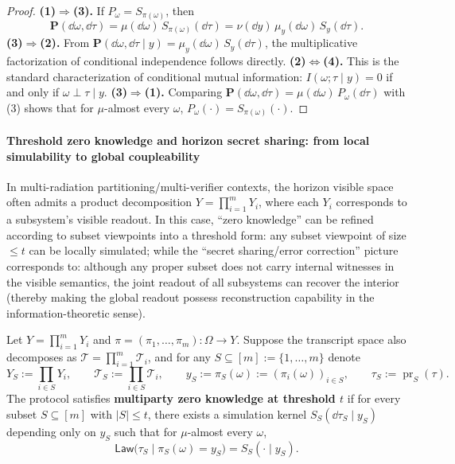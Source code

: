 \begin{proof}
\textbf{(1)\(\Rightarrow\)(3).}
If \(P_{\omega}=S_{\pi(\omega)}\), then
\[
\mathbf{P}(\dd\omega,\dd\tau)
=
\mu(\dd\omega)\,S_{\pi(\omega)}(\dd\tau)
=
\nu(\dd y)\,\mu_y(\dd\omega)\,S_y(\dd\tau).
\]
\textbf{(3)\(\Rightarrow\)(2).}
From \(\mathbf{P}(\dd\omega,\dd\tau\mid y)=\mu_y(\dd\omega)\,S_y(\dd\tau)\), the multiplicative factorization of conditional independence follows directly.
\textbf{(2)\(\Leftrightarrow\)(4).}
This is the standard characterization of conditional mutual information: \(I(\omega;\tau\mid y)=0\) if and only if \(\omega\perp \tau\mid y\).
\textbf{(3)\(\Rightarrow\)(1).}
Comparing \(\mathbf{P}(\dd\omega,\dd\tau)=\mu(\dd\omega)\,P_{\omega}(\dd\tau)\) with (3) shows that for \(\mu\)-almost every \(\omega\), \(P_{\omega}(\cdot)=S_{\pi(\omega)}(\cdot)\).
\qedhere
\end{proof}

\paragraph{Threshold zero knowledge and horizon secret sharing: from local simulability to global coupleability}
In multi-radiation partitioning/multi-verifier contexts, the horizon visible space often admits a product decomposition \(Y=\prod_{i=1}^{m}Y_i\), where each \(Y_i\) corresponds to a subsystem's visible readout.
In this case, ``zero knowledge'' can be refined according to subset viewpoints into a threshold form: any subset viewpoint of size \(\le t\) can be locally simulated; while the ``secret sharing/error correction'' picture corresponds to: although any proper subset does not carry internal witnesses in the visible semantics, the joint readout of all subsystems can recover the interior (thereby making the global readout possess reconstruction capability in the information-theoretic sense).

\begin{definition}\label{def:xi-threshold-zk}
Let \(Y=\prod_{i=1}^{m}Y_i\) and \(\pi=(\pi_1,\dots,\pi_m):\Omega\to Y\).
Suppose the transcript space also decomposes as \(\mathcal{T}=\prod_{i=1}^{m}\mathcal{T}_i\), and for any \(S\subseteq[m]:=\{1,\dots,m\}\) denote
\[
Y_S:=\prod_{i\in S}Y_i,\qquad
\mathcal{T}_S:=\prod_{i\in S}\mathcal{T}_i,
\qquad
y_S:=\pi_S(\omega):=(\pi_i(\omega))_{i\in S},
\qquad
\tau_S:=\operatorname{pr}_S(\tau).
\]
The protocol satisfies \textbf{multiparty zero knowledge at threshold \(t\)} if for every subset \(S\subseteq[m]\) with \(|S|\le t\), there exists a simulation kernel
\(
S_S(\dd\tau_S\mid y_S)
\)
depending only on \(y_S\) such that for \(\mu\)-almost every \(\omega\),
\[
\mathsf{Law}\bigl(\tau_S\mid \pi_S(\omega)=y_S\bigr)=S_S(\cdot\mid y_S).
\]
\end{definition}

